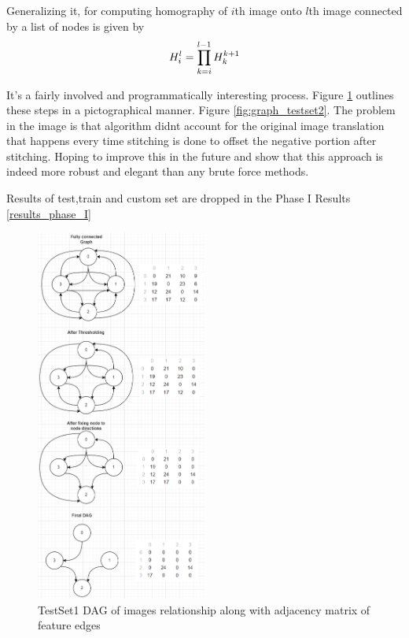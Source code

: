 \documentclass[conference]{IEEEtran}
\begin{document}
Generalizing it, for computing homography of $i$th image onto $l$th image connected by a list of nodes is given by 
\begin{equation}
\label{equation:recursive_homography}
H_{i}^{l} \space = \space \prod_{k=i}^{l-1}H_{k}^{k+1}
\end{equation}


It's a fairly involved and programmatically interesting process. Figure \ref{fig:graph_construction} outlines these steps in a pictographical manner. Figure \ref{fig:graph_testset2}. The problem in the image is that algorithm didnt account for the original image translation that happens every time stitching is done to offset the negative portion after stitching. Hoping to improve this in the future and show that this approach is indeed more robust and elegant than any brute force methods. 

Results of test,train and custom set are dropped in the Phase I Results \ref{results_phase_I}

\begin{figure}[!h]
  \centering
  \captionsetup{justification=centering}
  \includegraphics[width=0.5\textwidth]{phase1/graph_appraoch.png}
  \caption{\label{fig:graph_construction}TestSet1 DAG of images relationship along with adjacency matrix of feature edges }
\end{figure}
\end{document}

